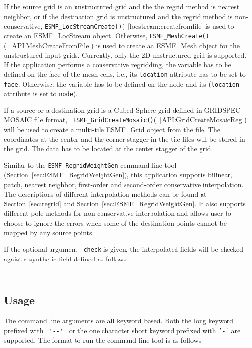 If the source grid is an unstructured grid and the the regrid method is nearest neighbor, or if the destination grid 
is unstructured and the regrid method is non-conservative, {\tt ESMF\_LocStreamCreate()}(~\ref{locstream:createfromfile} is used to create an ESMF\_LocStream object.  Otherwise,
{\tt ESMF\_MeshCreate()}(~\ref{API:MeshCreateFromFile}) is used to create an ESMF\_Mesh object for the unstructured 
input grids.  Currently, only the 2D unstructured grid is supported.
If the application performs a conservative regridding, the variable has to be defined on the face of the mesh cells, i.e., its {\tt location} attribute has to be set to {\tt face}.  Otherwise, the variable has to be 
defined on the node and its ({\tt location} attribute is set to {\tt node}).

If a source or a destination grid is a Cubed Sphere grid defined in GRIDSPEC
MOSAIC file format, {\tt
  ESMF\_GridCreateMosaic()}(~\ref{API:GridCreateMosaicReg}) will be used to create a multi-tile ESMF\_Grid
object from the file.  The coordinates at the center and the corner stagger in
the tile files will be stored in the grid.  The data has to be located at the
center stagger of the grid.
 
Similar to the {\tt ESMF\_RegridWeightGen} command line tool (Section~\ref{sec:ESMF_RegridWeightGen}), this application supports
bilinear, patch, nearest neighbor, first-order and second-order conservative interpolation. The descriptions of different 
interpolation methods can be found at Section~\ref{sec:regrid} and Section~\ref{sec:ESMF_RegridWeightGen}. 
It also supports different pole methods for non-conservative interpolation and allows user to choose to 
ignore the errors when some of the destination points cannot be mapped by any source points. 

If the optional argument {\tt --check} is given, the interpolated fields will
be checked agaist a synthetic field defined as follows:

\begin{verbatim}
   
\end{verbatim}

\subsection{Usage}\label{sec:fileregridusage}

The command line arguments are all keyword based.  Both the long keyword prefixed with \verb+ '--' + or the
one character short keyword prefixed with {\tt '-'} are supported.  The format to run the command line tool is as follows:

